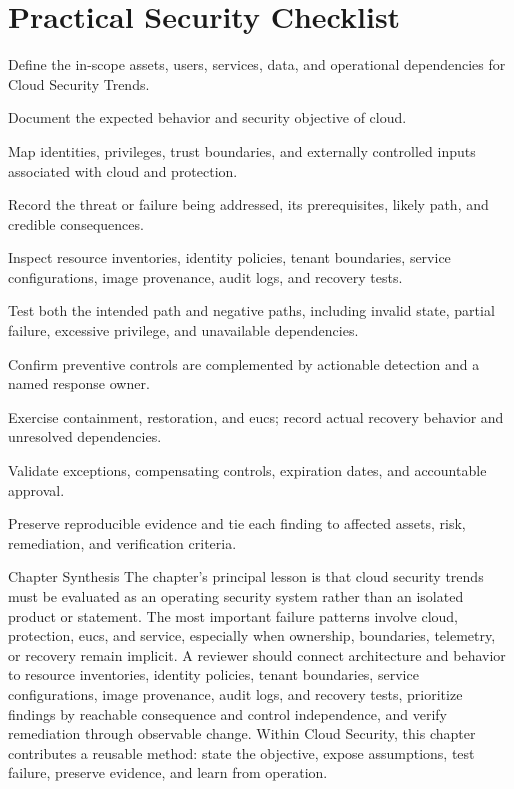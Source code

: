 \documentclass[11pt,letterpaper]{article}
\begin{document}
\section*{Practical Security Checklist}
\begin{CornellChecklist}
\item Define the in-scope assets, users, services, data, and operational dependencies for Cloud Security Trends.
\item Document the expected behavior and security objective of cloud.
\item Map identities, privileges, trust boundaries, and externally controlled inputs associated with cloud and protection.
\item Record the threat or failure being addressed, its prerequisites, likely path, and credible consequences.
\item Inspect resource inventories, identity policies, tenant boundaries, service configurations, image provenance, audit logs, and recovery tests.
\item Test both the intended path and negative paths, including invalid state, partial failure, excessive privilege, and unavailable dependencies.
\item Confirm preventive controls are complemented by actionable detection and a named response owner.
\item Exercise containment, restoration, and eucs; record actual recovery behavior and unresolved dependencies.
\item Validate exceptions, compensating controls, expiration dates, and accountable approval.
\item Preserve reproducible evidence and tie each finding to affected assets, risk, remediation, and verification criteria.
\end{CornellChecklist}
\begin{CornellSummaryBox}{Chapter Synthesis}
The chapter's principal lesson is that cloud security trends must be evaluated as an operating security system rather than an isolated product or statement. The most important failure patterns involve cloud, protection, eucs, and service, especially when ownership, boundaries, telemetry, or recovery remain implicit. A reviewer should connect architecture and behavior to resource inventories, identity policies, tenant boundaries, service configurations, image provenance, audit logs, and recovery tests, prioritize findings by reachable consequence and control independence, and verify remediation through observable change. Within Cloud Security, this chapter contributes a reusable method: state the objective, expose assumptions, test failure, preserve evidence, and learn from operation.
\end{CornellSummaryBox}
\end{document}
